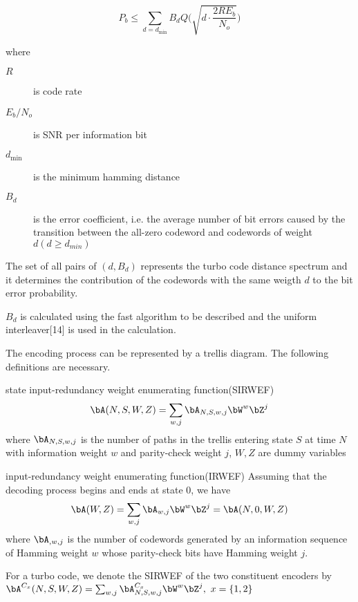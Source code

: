 \documentclass[11pt, oneside, dvipdfmx]{book}
\begin{document}
\begin{equation}
P_b \leq \sum_{d=d_{\text{min}}}^{} B_dQ\Bigg(  \sqrt{d \cdot \frac{2RE_b}{N_o}}\Bigg)
\label{1}
\end{equation}

where 
\begin{description}
\item [$R$] is code rate
\item [$E_b/N_o$] is SNR per information bit
\item [$d_{\text{min}}$] is the minimum hamming distance 
\item [$B_d$] is
the error coefficient, i.e. the average number of bit
errors caused by the transition between the all-zero codeword
and codewords of weight $d (d \geq d_{min})$
\end{description}
The set of all pairs of $(d,B_d)$ represents the turbo code distance spectrum and it determines the contribution of the codewords with the same weigth $d$ to the bit error probability.  

$B_d$ is calculated using the fast algorithm to be described and the uniform interleaver[14] is used in the calculation. 

The encoding process can be represented by a trellis diagram. The following definitions are necessary.

\begin{MyDefinition}{state input-redundancy weight enumerating function(SIRWEF)}
\begin{equation}
\bA(N,S,W,Z) =\sum_{w,j} \bA_{N,S,w,j} \bW^w \bZ^j
\end{equation} 
where $ \bA_{N,S,w,j}$ is the number of paths in the trellis entering state $S$ at time $N$ with information weight $w$ and parity-check weight $j$, $W,Z$ are dummy variables
\end{MyDefinition}

\begin{MyDefinition}{input-redundancy weight enumerating function(IRWEF)}
Assuming that the decoding process begins and ends at state $0$, we have
\begin{equation}
\bA(W,Z) =\sum_{w,j} \bA_{w,j} \bW^w \bZ^j=\bA(N,0,W,Z)
\label{3}
\end{equation} 
where $ \bA_{,w,j} $ is the number of codewords generated by an information sequence of Hamming weight $w$ whose parity-check bits have Hamming weight $j$.
\end{MyDefinition}
For a turbo code, we denote the SIRWEF of the two constituent encoders by $\bA^{C_x}(N,S,W,Z) =\sum_{w,j} \bA^{C_x}_{N,S,w,j} \bW^w \bZ^j,~x=\{1,2\}$
\end{document}

